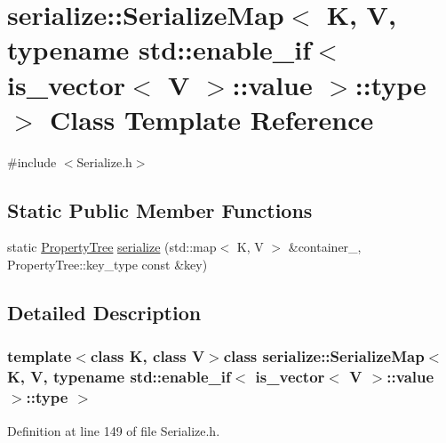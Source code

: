 \hypertarget{classserialize_1_1_serialize_map_3_01_k_00_01_v_00_01typename_01std_1_1enable__if_3_01is__vector3a4a5c31f236854fe1872e17684001d1}{}\section{serialize\+:\+:Serialize\+Map$<$ K, V, typename std\+:\+:enable\+\_\+if$<$ is\+\_\+vector$<$ V $>$\+:\+:value $>$\+:\+:type $>$ Class Template Reference}
\label{classserialize_1_1_serialize_map_3_01_k_00_01_v_00_01typename_01std_1_1enable__if_3_01is__vector3a4a5c31f236854fe1872e17684001d1}


{\ttfamily \#include $<$Serialize.\+h$>$}

\subsection*{Static Public Member Functions}
\begin{DoxyCompactItemize}
\item 
static \hyperlink{namespacesolar__core_adeda2737d6938c190eb774a5b2495045}{Property\+Tree} \hyperlink{classserialize_1_1_serialize_map_3_01_k_00_01_v_00_01typename_01std_1_1enable__if_3_01is__vector3a4a5c31f236854fe1872e17684001d1_a7760a9ba3e2e598491ceda85d56e7276}{serialize} (std\+::map$<$ K, V $>$ \&container\+\_\+, Property\+Tree\+::key\+\_\+type const \&key)
\end{DoxyCompactItemize}


\subsection{Detailed Description}
\subsubsection*{template$<$class K, class V$>$class serialize\+::\+Serialize\+Map$<$ K, V, typename std\+::enable\+\_\+if$<$ is\+\_\+vector$<$ V $>$\+::value $>$\+::type $>$}



Definition at line 149 of file Serialize.\+h.



